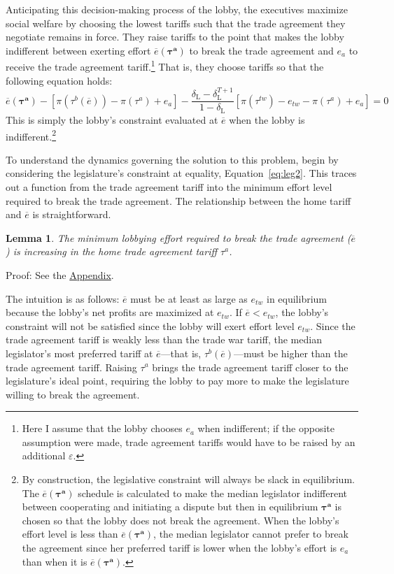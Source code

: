 \documentclass[authoryear, review]{elsarticle}
\newtheorem{lemma}{Lemma}
\newcommand{\ov}{\overline}
\newcommand{\bta}{\bm{\tau^a}}
\newcommand{\de}{\delta}
\begin{document}
Anticipating this decision-making process of the lobby, the executives maximize social welfare by choosing the lowest tariffs such that the trade agreement they negotiate remains in force. They raise tariffs to the point that makes the lobby indifferent between exerting effort $\ov{e}(\bta)$ to break the trade agreement and $e_a$ to receive the trade agreement tariff.\footnote{Here I assume that the lobby chooses $e_a$ when indifferent; if the opposite assumption were made, trade agreement tariffs would have to be raised by an additional $\varepsilon$.} That is, they choose tariffs so that the following equation holds:
\begin{equation}
  \ov{e}(\bta) - \left[ \pi(\tau^b(\ov{e})) - \pi(\tau^a) + e_a\right] - \frac{\de_\text{L} - \de_\text{L}^{T+1}}{1-\de_\text{L}} \left[\pi(\tau^{tw}) -e_{tw} - \pi(\tau^a) + e_a \right] = 0
  \label{eq:lob2}
\end{equation}
This is simply the lobby's constraint evaluated at $\ov{e}$ when the lobby is indifferent.\footnote{By construction, the legislative constraint will always be slack in equilibrium. The $\ov{e}(\bta)$ schedule is calculated to make the median legislator indifferent between cooperating and initiating a dispute but then in equilibrium $\bta$ is chosen so that the lobby does not break the agreement. When the lobby's effort level is less than $\ov{e}(\bta)$, the median legislator cannot prefer to break the agreement since her preferred tariff is lower when the lobby's effort is $e_a$ than when it is $\ov{e}(\bta)$.}

To understand the dynamics governing the solution to this problem, begin by considering the legislature's constraint at equality, Equation~\ref{eq:leg2}. This traces out a function from the trade agreement tariff into the minimum effort level required to break the trade agreement. The relationship between the home tariff and $\ov{e}$ is straightforward. 
\begin{lemma}
  The minimum lobbying effort required to break the trade agreement ($\ov{e}$) is increasing in the home trade agreement tariff $\tau^a$.
  \label{lem:et}
\end{lemma}
Proof: See the \hyperlink{Cor_et}{Appendix}.

\noindent The intuition is as follows: $\ov{e}$ must be at least as large as $e_{tw}$ in equilibrium because the lobby's net profits are maximized at $e_{tw}$. If $\ov{e} < e_{tw}$, the lobby's constraint will not be satisfied since the lobby will exert effort level $e_{tw}$. Since the trade agreement tariff is weakly less than the trade war tariff, the median legislator's most preferred tariff at $\ov{e}$---that is, $\tau^b\left(\ov{e}\right)$---must be higher than the trade agreement tariff. Raising $\tau^a$ brings the trade agreement tariff closer to the legislature's ideal point, requiring the lobby to pay more to make the legislature willing to break the agreement.
\end{document}
